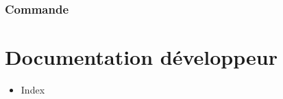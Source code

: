 \documentclass[letterpaper,10pt,french]{sphinxmanual}
\begin{document}
\subsection{Commande}
\label{\detokenize{exemples/fonctions:commande}}
\begin{sphinxVerbatim}[commandchars=\\\{\}]
  \PYGZbs{}
	 \PYGZbs{}
	  \PYGZbs{}
	  \PYGZbs{}
	 
\end{sphinxVerbatim}


\chapter{Documentation développeur}
\label{\detokenize{index:documentation-developpeur}}\begin{itemize}
\item {} 
\sphinxAtStartPar
Index

\end{itemize}



\renewcommand{\indexname}{Index}
\printindex
\end{document}
